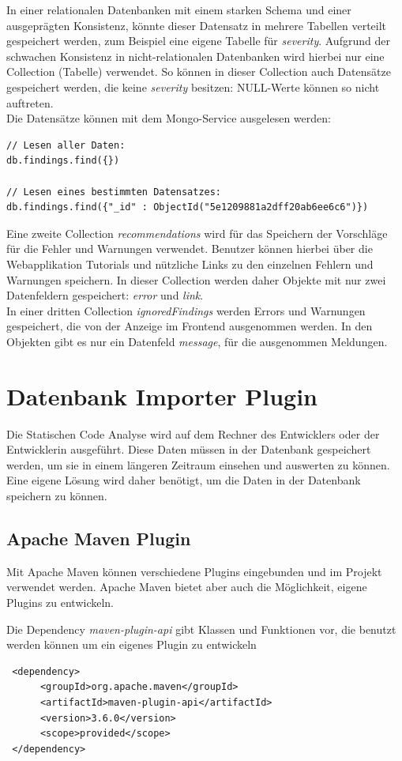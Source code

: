 In einer relationalen Datenbanken mit einem starken Schema und einer ausgeprägten Konsistenz, könnte dieser Datensatz in mehrere Tabellen verteilt gespeichert werden, zum Beispiel eine eigene Tabelle für \textit{severity}. Aufgrund der schwachen Konsistenz in nicht-relationalen Datenbanken wird hierbei nur eine Collection (Tabelle) verwendet. So können in dieser Collection auch Datensätze gespeichert werden, die keine \textit{severity} besitzen: NULL-Werte können so nicht auftreten. \\
Die Datensätze können mit dem Mongo-Service ausgelesen werden: 

\begin{verbatim}
// Lesen aller Daten:
db.findings.find({})

// Lesen eines bestimmten Datensatzes:
db.findings.find({"_id" : ObjectId("5e1209881a2dff20ab6ee6c6")})
\end{verbatim}

Eine zweite Collection \textit{recommendations} wird für das Speichern der Vorschläge für die Fehler und Warnungen verwendet. Benutzer können hierbei über die Webapplikation Tutorials und nützliche Links zu den einzelnen Fehlern und Warnungen speichern.
In dieser Collection werden daher Objekte mit nur zwei Datenfeldern gespeichert: \textit{error} und \textit{link}. \\
In einer dritten Collection \textit{ignoredFindings} werden Errors und Warnungen gespeichert, die von der Anzeige im Frontend ausgenommen werden. In den Objekten gibt es nur ein Datenfeld \textit{message}, für die ausgenommen Meldungen.
\section{Datenbank Importer Plugin} 
Die Statischen Code Analyse wird auf dem Rechner des Entwicklers oder der Entwicklerin ausgeführt. Diese Daten müssen in der Datenbank gespeichert werden, um sie in einem längeren Zeitraum einsehen und auswerten zu können. Eine eigene Lösung wird daher benötigt, um die Daten in der Datenbank speichern zu können. 
\subsection{Apache Maven Plugin}
Mit Apache Maven können verschiedene Plugins eingebunden und im Projekt verwendet werden. Apache Maven bietet aber auch die Möglichkeit, eigene Plugins zu entwickeln.\cite{anardu2014maven}

Die Dependency \textit{maven-plugin-api} gibt Klassen und Funktionen vor, die benutzt werden können um ein eigenes Plugin zu entwickeln
\begin{verbatim}
 <dependency>
      <groupId>org.apache.maven</groupId>
      <artifactId>maven-plugin-api</artifactId>
      <version>3.6.0</version>
      <scope>provided</scope>
 </dependency>
\end{verbatim}

